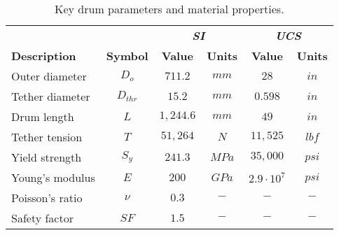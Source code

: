 \begin{table}[ht]
	\caption{Key drum parameters and material properties.}
	\centering
	\begin{tabular}{lccccc}
		&       & \multicolumn{2}{c}{\textbf{\textit{SI}}} & \multicolumn{2}{c}{\textbf{\textit{UCS}}} \\
		\textbf{Description} & \textbf{Symbol} & \textbf{Value} & \textbf{Units} & \textbf{Value}  & \textbf{Units} \\
		\midrule
		Outer diameter       & $D_o$           & $711.2$        & $mm$           & $28$            & $in$           \\
		Tether diameter      & $D_{thr}$       & $15.2$         & $mm$           & $0.598$         & $in$           \\
		Drum length          & $L$             & $1,244.6$      & $mm$           & $49$            & $in$           \\
		Tether tension       & $T$             & $51,264$       & $N$            & $11,525$        & $lbf$          \\
		Yield strength       & $S_y$           & $241.3$        & $MPa$          & $35,000$        & $psi$          \\
		Young's modulus      & $E$             & $200$          & $GPa$          & $2.9\cdot 10^7$ & $psi$          \\
		Poisson's ratio      & $\nu$           & $0.3$          & $-$            & $-$             & $-$            \\
		Safety factor        & $SF$            & $1.5$          & $-$            & $-$             & $-$            \\
	\end{tabular}%
	\label{table:prelim_params}
\end{table}

